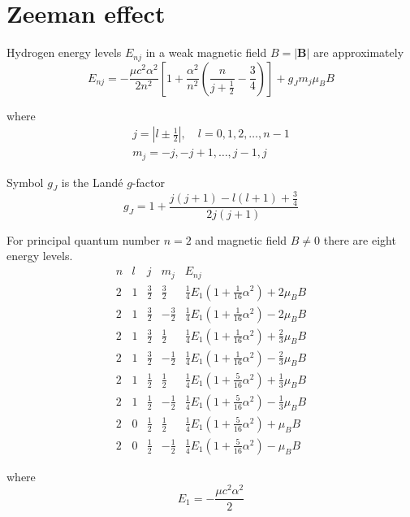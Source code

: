 

\section*{Zeeman effect}

Hydrogen energy levels $E_{nj}$ in a weak magnetic field $B=|\mathbf B|$ are approximately
\begin{equation*}
E_{nj}=-\frac{\mu c^2\alpha^2}{2n^2}
\left[
1+\frac{\alpha^2}{n^2}\left(\frac{n}{j+\frac{1}{2}}-\frac{3}{4}\right)
\right]+g_Jm_j\mu_BB
\end{equation*}

where
\begin{gather*}
j=\left|l\pm\tfrac{1}{2}\right|,\quad l=0,1,2,\ldots,n-1
\\[1ex]
m_j=-j,-j+1,\ldots,j-1,j
\end{gather*}

Symbol $g_J$ is the Land\'e $g$-factor
\begin{equation*}
g_J=1+\frac{j(j+1)-l(l+1)+\frac{3}{4}}{2j(j+1)}
\end{equation*}

For principal quantum number $n=2$ and magnetic field $B\ne0$ there are eight energy levels.
\begin{equation*}
\begin{matrix}
n & l & j & m_j & E_{nj}
\\[2ex]
2 & 1 & \frac{3}{2} & \frac{3}{2} &
\frac{1}{4}E_1(1+\tfrac{1}{16}\alpha^2)+2\mu_BB
\\[2ex]
2 & 1 & \frac{3}{2} & -\frac{3}{2} &
\frac{1}{4}E_1(1+\tfrac{1}{16}\alpha^2)-2\mu_BB
\\[2ex]
2 & 1 & \frac{3}{2} & \frac{1}{2} &
\frac{1}{4}E_1(1+\tfrac{1}{16}\alpha^2)+\frac{2}{3}\mu_BB
\\[2ex]
2 & 1 & \frac{3}{2} & -\frac{1}{2} &
\frac{1}{4}E_1(1+\tfrac{1}{16}\alpha^2)-\frac{2}{3}\mu_BB
\\[2ex]
2 & 1 & \frac{1}{2} & \frac{1}{2} &
\frac{1}{4}E_1(1+\tfrac{5}{16}\alpha^2)+\frac{1}{3}\mu_BB
\\[2ex]
2 & 1 & \frac{1}{2} & -\frac{1}{2} &
\frac{1}{4}E_1(1+\tfrac{5}{16}\alpha^2)-\frac{1}{3}\mu_BB
\\[2ex]
2 & 0 & \frac{1}{2} & \frac{1}{2} &
\frac{1}{4}E_1(1+\tfrac{5}{16}\alpha^2)+\mu_BB
\\[2ex]
2 & 0 & \frac{1}{2} & -\frac{1}{2} &
\frac{1}{4}E_1(1+\tfrac{5}{16}\alpha^2)-\mu_BB
\end{matrix}
\end{equation*}

where
\begin{equation*}
E_1=-\frac{\mu c^2\alpha^2}{2}
\end{equation*}


